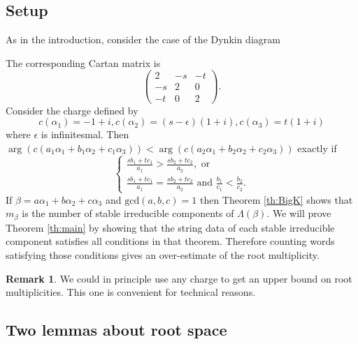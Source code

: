 \documentclass{amsart}
\numberwithin{equation}{section}
\numberwithin{figure}{section}
\numberwithin{table}{section}
\theoremstyle{definition}
\newtheorem{Remark}[equation]{Remark}
\begin{document}
\subsection{Setup}

 As in the introduction, consider the case of the Dynkin diagram
\begin{center}
\end{center}
The corresponding Cartan matrix is
 $$
\left(
\begin{array}{rrr}
2&-s&-t\\
-s&2&0\\
-t&0&2
\end{array}
\right).
$$
Consider the charge defined by
$$c(\alpha_1)=-1+i, c(\alpha_2) =(s-\epsilon)(1+i), c(\alpha_3)= t(1 +i) $$
where $\epsilon$ is infinitesmal.  
Then $\arg (c(a_1 \alpha_1+b_1 \alpha_2 +c_1\alpha_3)) < \arg (c( a_2 \alpha_1+b_2 \alpha_2 +c_2\alpha_3))$ exactly if
$$\begin{cases}
\frac{sb_1+tc_1}{a_1} > \frac{sb_2+tc_2}{a_2}, \text{ or }  \\
\frac{sb_1+tc_1}{a_1} = \frac{sb_2+tc_2}{a_2} \text{ and }  \frac{b_1}{c_1} < \frac{b_2}{c_2}. 
\end{cases}
$$
If $\beta=a \alpha_1+b \alpha_2 +c\alpha_3$ and  $\text{gcd}(a,b,c)=1$ then Theorem \ref{th:BigK} shows that $m_\beta$ is the number of stable irreducible components of $\Lambda(\beta)$. We will prove Theorem \ref{th:main} by showing that the string data of each stable irreducible component satisfies all conditions in that theorem. Therefore counting words satisfying those conditions gives an over-estimate of the root multiplicity. 

\begin{Remark}
We could in principle use any charge to get an upper bound on root multiplicities. This one is convenient for technical reasons. 
\end{Remark}

\subsection{Two lemmas about root space}
\end{document}
